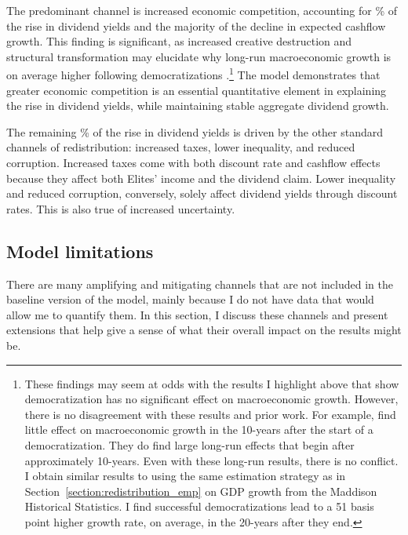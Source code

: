 \documentclass[12pt]{article}
\numberwithin{equation}{section}
\begin{document}
The predominant channel is increased economic competition, accounting for \tabTwelveComp\% of the rise in dividend yields and the majority of the decline in expected cashflow growth. This finding is significant, as increased creative destruction and structural transformation may elucidate why long-run macroeconomic growth is on average higher following democratizations \citep*{Aghion2008,Aghion2014,Acemoglu2015,Bravo2021}.\footnote{These findings may seem at odds with the results I highlight above that show democratization has no significant effect on macroeconomic growth. However, there is no disagreement with these results and prior work. For example, \cite{Acemoglu2019} find little effect on macroeconomic growth in the 10-years after the start of a democratization. They do find large long-run effects that begin after approximately 10-years. Even with these long-run results, there is no conflict.  I obtain similar results to \citeauthor{Acemoglu2019} using the same estimation strategy as in Section~\ref{section:redistribution_emp} on GDP growth from the Maddison Historical Statistics. I find successful democratizations lead to a 51 basis point higher growth rate, on average, in the 20-years after they end.} The model demonstrates that greater economic competition is an essential quantitative element in explaining the rise in dividend yields, while maintaining stable aggregate dividend growth.

The remaining \tabTwelveNonComp\% of the rise in dividend yields is driven by the other standard channels of redistribution: increased taxes, lower inequality, and reduced corruption. Increased taxes come with both discount rate and cashflow effects because they affect both Elites' income and the dividend claim. Lower inequality and reduced corruption, conversely, solely affect dividend yields through discount rates. This is also true of increased uncertainty.

\subsection{Model limitations}\label{section:model_limitations}
There are many amplifying and mitigating channels that are not included in the baseline version of the model, mainly because I do not have data that would allow me to quantify them. In this section, I discuss these channels and present extensions that help give a sense of what their overall impact on the results might be.
\end{document}
